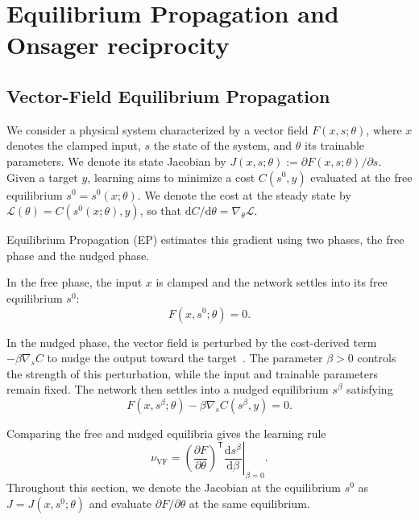 \documentclass{article}
\begin{document}
\section{Equilibrium Propagation and Onsager reciprocity}
\label{sec:equilibrium_onsager}

\subsection{Vector-Field Equilibrium Propagation}
\label{sec:vector_field_ep}

We consider a physical system characterized by a vector field
$F(x,s;\theta)$, where $x$ denotes the clamped input, $s$ the state of the
system, and $\theta$ its trainable parameters. We denote its state Jacobian
by $J(x,s;\theta):=\partial F(x,s;\theta)/\partial s$.
Given a target $y$, learning
aims to minimize a cost $C(s^0,y)$ evaluated at the free equilibrium
$s^0=s^0(x;\theta)$. We denote the cost at the steady state by
$\mathcal L(\theta)=C(s^0(x;\theta),y)$, so that
$\mathrm dC/\mathrm d\theta=\nabla_\theta\mathcal L$.

Equilibrium Propagation (EP) estimates this gradient using two phases,
the free phase and the nudged phase.

In the free phase, the input $x$ is clamped and the network settles into
its free equilibrium $s^0$:
\begin{equation}
F(x,s^0;\theta)=0.
\label{eq:vector_field_free_equilibrium}
\end{equation}

In the nudged phase, the vector field is perturbed by the cost-derived
term $-\beta\nabla_s C$ to nudge the output toward the
target~\cite{scellier2018generalization}. The parameter $\beta>0$ controls
the strength of this perturbation, while the input and trainable parameters
remain fixed. The network then settles into a nudged equilibrium $s^\beta$
satisfying
\begin{equation}
F(x,s^\beta;\theta)-\beta\nabla_s C(s^\beta,y)=0.
\label{eq:vector_field_nudged_equilibrium}
\end{equation}

Comparing the free and nudged equilibria gives the learning rule
\begin{equation}
\nu_{\mathrm{VF}}
=
\left(\frac{\partial F}{\partial\theta}\right)^{\mathsf T}
\left.\frac{\mathrm ds^\beta}{\mathrm d\beta}\right|_{\beta=0}.
\label{eq:vector_field_learning_rule}
\end{equation}
Throughout this section, we denote the Jacobian at the equilibrium $s^0$ as $J=J(x,s^0;\theta)$ and evaluate
$\partial F/\partial\theta$ at the same equilibrium.
\end{document}
